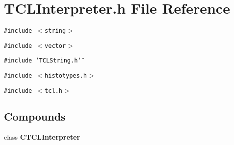 \section{TCLInterpreter.h File Reference}
\label{TCLInterpreter_8h}
{\tt \#include $<$string$>$}\par
{\tt \#include $<$vector$>$}\par
{\tt \#include \char`\"{}TCLString.h\char`\"{}}\par
{\tt \#include $<$histotypes.h$>$}\par
{\tt \#include $<$tcl.h$>$}\par
\subsection*{Compounds}
\begin{CompactItemize}
\item 
class {\bf CTCLInterpreter}
\end{CompactItemize}

